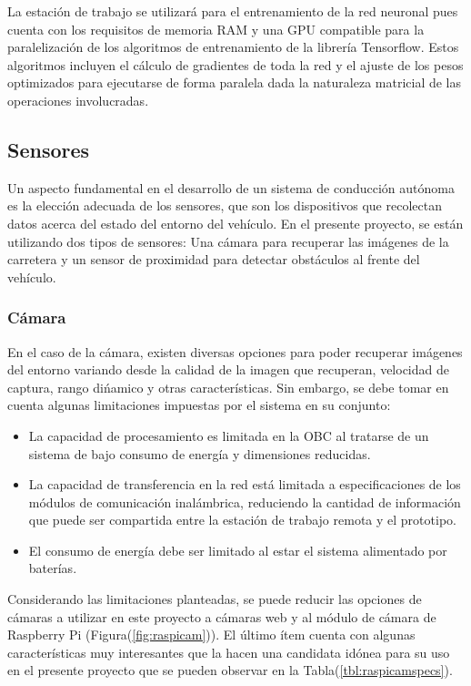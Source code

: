     La estación de trabajo se utilizará para el entrenamiento de la red neuronal pues cuenta con los requisitos de memoria RAM y una 
    GPU compatible para la paralelización de los algoritmos de entrenamiento de la librería Tensorflow. Estos algoritmos incluyen 
    el cálculo de gradientes de toda la red y el ajuste de los pesos optimizados para ejecutarse de forma paralela dada la naturaleza
    matricial de las operaciones involucradas.

    \subsection{Sensores}
    Un aspecto fundamental en el desarrollo de un sistema de conducción autónoma es la elección adecuada de los sensores, que son 
    los dispositivos que recolectan datos acerca del estado del entorno del vehículo. En el presente proyecto, se están utilizando 
    dos tipos de sensores: Una cámara para recuperar las imágenes de la carretera y un sensor de proximidad para detectar obstáculos 
    al frente del vehículo.
        \subsubsection{Cámara}
        En el caso de la cámara, existen diversas opciones para poder recuperar imágenes del entorno variando desde la calidad 
        de la imagen que recuperan, velocidad de captura, rango dińamico y otras características. Sin embargo, se debe tomar 
        en cuenta algunas limitaciones impuestas por el sistema en su conjunto:

        \begin{itemize}
            \item La capacidad de procesamiento es limitada en la OBC al tratarse de un sistema de bajo consumo de energía y dimensiones reducidas.
            \item La capacidad de transferencia en la red está limitada a especificaciones de los módulos de comunicación inalámbrica, reduciendo la cantidad de información que puede ser compartida entre la estación de trabajo remota y el prototipo.
            \item El consumo de energía debe ser limitado al estar el sistema alimentado por baterías.
        \end{itemize}

        Considerando las limitaciones planteadas, se puede reducir las opciones de cámaras a utilizar en este proyecto a cámaras web 
        y al módulo de cámara de Raspberry Pi (Figura(\ref{fig:raspicam})). El último ítem cuenta con algunas características muy interesantes que la hacen una 
        candidata idónea para su uso en el presente proyecto que se pueden observar en la Tabla(\ref{tbl:raspicamspecs}).

